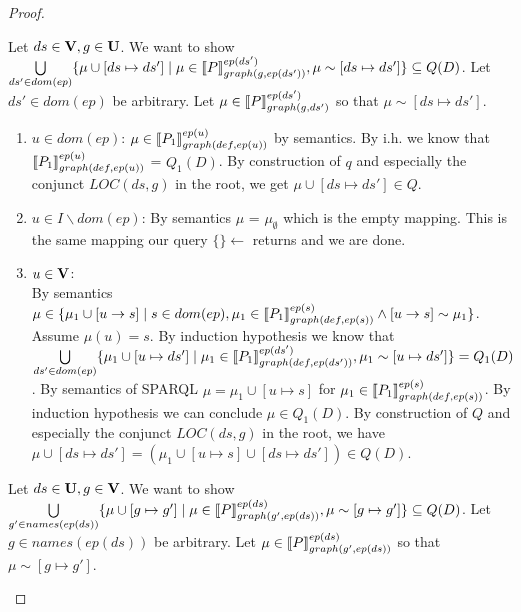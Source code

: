 \begin{proof}
\begin{enumerate}
			\bigskip\noindent
			Let $ds \in \mathbf{V},g \in \mathbf{U}$.
			We want to show\\ 
			$\bigcup\limits_{ds' \in dom(ep)} \{ \mu \cup [ds \mapsto ds'] \mid \mu \in
			\llbracket P\rrbracket^{ep(ds')}_{graph(g,ep(ds'))}, \mu \sim  [ds\mapsto ds'] \}  
			\subseteq Q(D)$.
			Let $ds' \in dom(ep)$ be arbitrary.
			Let $\mu \in \llbracket P \rrbracket^{ep(ds')}_{graph(g,ds')}$ so that $\mu \sim
			[ds\mapsto ds']$.
			\begin{enumerate}
				\item  $u \in dom(ep)$:
					$\mu \in \llbracket P_1\rrbracket^{ep(u)}_{graph(def,ep(u))}$ by semantics.
					By i.h. we know that 
					$\llbracket P_1 \rrbracket^{ep(u)}_{graph(def,ep(u))}$ =
					$Q_1(D)$. By construction of $q$ and especially the conjunct
					$LOC(ds,g)$ in the root, we get $\mu\cup[ds \mapsto ds'] \in Q$.
				\item $u \in I\backslash dom(ep)$:
					By semantics $\mu$ = $\mu_\emptyset$ which is the empty
					mapping. This is the same mapping our query
					$\{\} \leftarrow$ returns and we are
					done.
				\item $u \in \mathbf{V}$:\\
					By semantics $\mu \in \{ \mu_1 \cup [u \rightarrow s ] \mid
						s \in dom(ep), \mu_1 \in \llbracket P_1
						\rrbracket^{ep(s)}_{graph(def,ep(s))} \land
					[u \rightarrow s] \sim \mu_1 \}$. Assume $\mu(u) = s$.
					By induction hypothesis we know that 
					$\bigcup\limits_{ds' \in dom(ep)} \{ \mu_1 \cup [u
						\mapsto ds'] \mid \mu_1 \in
						\llbracket P_1\rrbracket^{ep(ds')}_{graph(def,ep(ds'))},
					\mu_1 \sim [u\mapsto ds'] \}  =
					Q_1(D) $. By semantics of SPARQL $\mu = \mu_1 \cup
					[u \mapsto s]$ for $\mu_1 \in \llbracket P_1 \rrbracket^{ep(s)}_{graph(def,ep(s))}$.
					By induction hypothesis we can conclude
					$\mu \in Q_1(D)$.
					By construction of $Q$ and especially the conjunct
					$LOC(ds,g)$ in the root, we have 
					$\mu \cup [ds\mapsto ds'] = (\mu_1 \cup [u
					\mapsto s] \cup [ds \mapsto ds']) \in Q(D)$. 
			\end{enumerate}

			\bigskip\noindent
			Let $ds \in \mathbf{U},g \in \mathbf{V}$.
			We want to show  $\bigcup\limits_{g' \in names(ep(ds))}\{ \mu \cup [g
				\mapsto g'] \mid \mu \in \llbracket P\rrbracket^{ep(ds)}_{graph(g',ep(ds))},
			\mu \sim	[g\mapsto g'] \} \subseteq Q(D)$.
			Let $g \in names(ep(ds))$ be arbitrary.
			Let $\mu \in \llbracket P \rrbracket^{ep(ds)}_{graph(g',ep(ds))}$ so that $\mu \sim
			[g\mapsto g']$.


\end{enumerate}
\end{proof}
